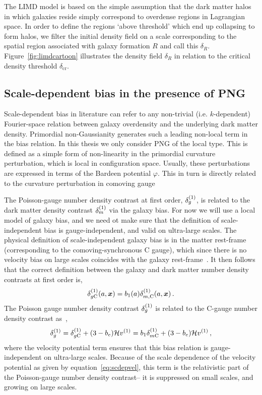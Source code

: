 The LIMD model is based on the simple assumption that the dark matter halos in which galaxies reside simply correspond to overdense regions in Lagrangian space. In order to define the regions `above threshold' which end up collapsing to form halos, we filter the initial density field on a scale corresponding to the spatial region associated with galaxy formation $R$ and call this $\delta_R$. Figure~\ref{fig:limdcartoon} illustrates the density field $\delta_R$ in relation to the critical density threshold $\delta_\mathrm{cr}$.



\fi

\subsection{Scale-dependent bias in the presence of PNG}
Scale-dependent bias in literature can refer to any non-trivial (i.e. $k$-dependent) Fourier-space relation between galaxy overdensity and the underlying dark matter density. Primordial non-Gaussianity generates such a leading non-local term in the bias relation. In this thesis we only consider PNG of the local type. This is defined as a simple form of non-linearity in the primordial curvature perturbation, which is local in configuration space. Usually, these perturbations are expressed in terms of the Bardeen potential $\varphi$. This in turn is directly related to the curvature perturbation in comoving gauge 


\iffalse



\iffalse
The Poisson-gauge number density contrast at first order, $\delta_g^{(1)}$, is related to the dark matter density contrast $\delta_m^{(1)}$ via the galaxy bias. For now we will use a local model of galaxy bias, and we need ot make sure that the definition of scale-independent bias is gauge-independent, and valid on ultra-large scales. The physical definition of scale-independent galaxy bias is in the matter rest-frame (corresponding to the comoving-synchronous C gauge), which since there is no velocity bias on large scales coincides with the galaxy rest-frame~\cite{Challinor:2011bk,Bruni:2011ta,Jeong:2011as}. It then follows that the correct definition between the galaxy and dark matter number density contrasts at first order is, 
\begin{equation}\label{eq:deltagbiasdef}
	\delta_{g\mathrm{C}}^{(1)} (a, \bm {x}) = b_1(a) \delta_{m,\mathrm{C}}^{(1)}(a,\bm {x})\,.
\end{equation}
The Poisson gauge number density contrast $\delta_g^{(1)}$ is related to the C-gauge number density contrast as~\cite{Challinor:2011bk}, 
\begin{equation}\label{eq:deltagFOPgtoCg}
	\delta_{g}^{(1)} = \delta_{g\mathrm{C}}^{(1)} + (3 - b_e)\mathcal{H} v^{(1)} = b_1 \delta_{m\mathrm{C}}^{(1)} + (3 - b_e) \mathcal{H} v^{(1)}\,,
\end{equation}
where the velocity potential term ensures that this bias relation is gauge-independent on ultra-large scales. Because of the scale dependence of the velocity potential as given by equation~\eqref{eq:scdepvel}, this term is the relativistic part of the Poisson-gauge number density contrast-- it is suppressed on small scales, and growing on large scales. 

